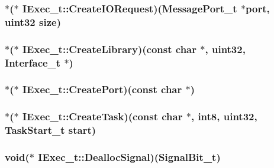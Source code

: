 \hypertarget{structIExec__t_a655a8fdc54cf3fbcbe83d04b1b34eeab}{
\subsubsection[{Create\+I\+O\+Request}]{$\ast$($\ast$ I\+Exec\+\_\+t\+::\+Create\+I\+O\+Request)({\bf Message\+Port\+\_\+t} $\ast$port, {\bf uint32} size)}}\label{structIExec__t_a655a8fdc54cf3fbcbe83d04b1b34eeab}
\hypertarget{structIExec__t_a7e8debe7cab7060a0e06ae1e71b9ffb1}{
\subsubsection[{Create\+Library}]{$\ast$($\ast$ I\+Exec\+\_\+t\+::\+Create\+Library)(const char $\ast$, {\bf uint32}, {\bf Interface\+\_\+t} $\ast$)}}\label{structIExec__t_a7e8debe7cab7060a0e06ae1e71b9ffb1}
\hypertarget{structIExec__t_a06713fa4b58876173f3274f26a8ca943}{
\subsubsection[{Create\+Port}]{$\ast$($\ast$ I\+Exec\+\_\+t\+::\+Create\+Port)(const char $\ast$)}}\label{structIExec__t_a06713fa4b58876173f3274f26a8ca943}
\hypertarget{structIExec__t_a2c21fff11647c6d05903827528522101}{
\subsubsection[{Create\+Task}]{$\ast$($\ast$ I\+Exec\+\_\+t\+::\+Create\+Task)(const char $\ast$, {\bf int8}, {\bf uint32}, {\bf Task\+Start\+\_\+t} start)}}\label{structIExec__t_a2c21fff11647c6d05903827528522101}
\hypertarget{structIExec__t_a30b70f83d842d6cb45d37543560e152d}{
\subsubsection[{Dealloc\+Signal}]{\setlength{\rightskip}{0pt plus 5cm}void($\ast$ I\+Exec\+\_\+t\+::\+Dealloc\+Signal)({\bf Signal\+Bit\+\_\+t})}}\label{structIExec__t_a30b70f83d842d6cb45d37543560e152d}
